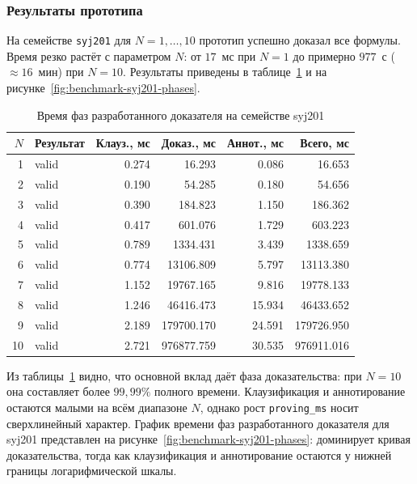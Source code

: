 \documentclass[14pt, russian]{scrartcl}
\begin{document}
\subsubsection{Результаты прототипа}

На семействе \texttt{syj201} для $N = 1, \ldots, 10$ прототип успешно доказал
все формулы. Время резко растёт с параметром $N$: от $17$~мс при $N = 1$ до
примерно $977$~с ($\approx 16$~мин) при $N = 10$. Результаты приведены в
таблице~\ref{tab:benchmark-syj201-family} и на рисунке~\ref{fig:benchmark-syj201-phases}.

\begin{table}[!htb]
\centering
\caption{Время фаз разработанного доказателя на семействе syj201}
\label{tab:benchmark-syj201-family}
\small
\begin{tabular}{|r|l|r|r|r|r|}
\hline
$N$ & Результат & Клауз., мс & Доказ., мс & Аннот., мс & Всего, мс \\
\hline
1 & valid & 0.274 & 16.293 & 0.086 & 16.653 \\
2 & valid & 0.190 & 54.285 & 0.180 & 54.656 \\
3 & valid & 0.390 & 184.823 & 1.150 & 186.362 \\
4 & valid & 0.417 & 601.076 & 1.729 & 603.223 \\
5 & valid & 0.789 & 1334.431 & 3.439 & 1338.659 \\
6 & valid & 0.774 & 13106.809 & 5.797 & 13113.380 \\
7 & valid & 1.152 & 19767.165 & 9.816 & 19778.133 \\
8 & valid & 1.246 & 46416.473 & 15.934 & 46433.652 \\
9 & valid & 2.189 & 179700.170 & 24.591 & 179726.950 \\
10 & valid & 2.721 & 976877.759 & 30.535 & 976911.016 \\
\hline
\end{tabular}
\end{table}

Из таблицы~\ref{tab:benchmark-syj201-family} видно, что основной вклад даёт фаза
доказательства: при $N = 10$ она составляет более $99{,}99\%$ полного времени.
Клаузификация и аннотирование остаются малыми на всём диапазоне $N$, однако
рост \texttt{proving\_ms} носит сверхлинейный характер. График времени фаз разработанного доказателя для syj201 представлен на рисунке~\ref{fig:benchmark-syj201-phases}: доминирует кривая доказательства, тогда как клаузификация и
аннотирование остаются у нижней границы логарифмической шкалы.
\end{document}
